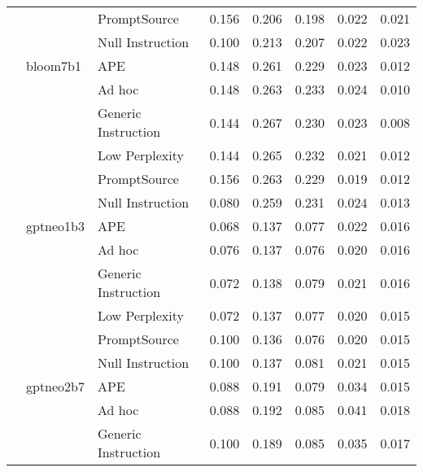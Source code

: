 \begin{supertabular}{lllrrrrr}
              &        & PromptSource &            0.156 &           0.206 &          0.198 &        0.022 &    0.021 \\
              &        & Null Instruction &            0.100 &           0.213 &          0.207 &        0.022 &    0.023 \\
              & bloom7b1 & APE &            0.148 &           0.261 &          0.229 &        0.023 &    0.012 \\
              &        & Ad hoc &            0.148 &           0.263 &          0.233 &        0.024 &    0.010 \\
              &        & Generic Instruction &            0.144 &           0.267 &          0.230 &        0.023 &    0.008 \\
              &        & Low Perplexity &            0.144 &           0.265 &          0.232 &        0.021 &    0.012 \\
              &        & PromptSource &            0.156 &           0.263 &          0.229 &        0.019 &    0.012 \\
              &        & Null Instruction &            0.080 &           0.259 &          0.231 &        0.024 &    0.013 \\
              & gptneo1b3 & APE &            0.068 &           0.137 &          0.077 &        0.022 &    0.016 \\
              &        & Ad hoc &            0.076 &           0.137 &          0.076 &        0.020 &    0.016 \\
              &        & Generic Instruction &            0.072 &           0.138 &          0.079 &        0.021 &    0.016 \\
              &        & Low Perplexity &            0.072 &           0.137 &          0.077 &        0.020 &    0.015 \\
              &        & PromptSource &            0.100 &           0.136 &          0.076 &        0.020 &    0.015 \\
              &        & Null Instruction &            0.100 &           0.137 &          0.081 &        0.021 &    0.015 \\
              & gptneo2b7 & APE &            0.088 &           0.191 &          0.079 &        0.034 &    0.015 \\
              &        & Ad hoc &            0.088 &           0.192 &          0.085 &        0.041 &    0.018 \\
              &        & Generic Instruction &            0.100 &           0.189 &          0.085 &        0.035 &    0.017 \\

\end{supertabular}
